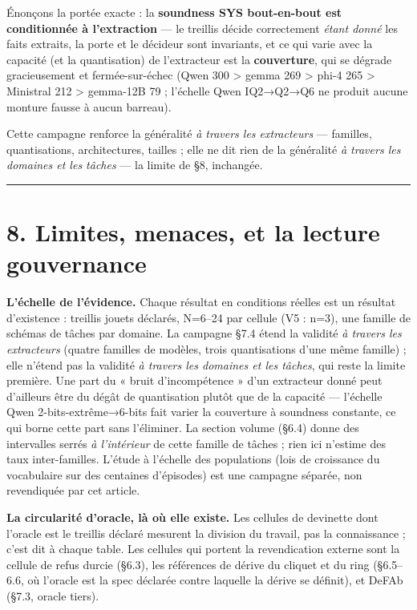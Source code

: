 \documentclass[11pt]{article}
\begin{document}
Énonçons la portée exacte : la \textbf{soundness SYS bout-en-bout est conditionnée à l'extraction} — le treillis décide correctement \emph{étant donné} les faits extraits, la porte et le décideur sont invariants, et ce qui varie avec la capacité (et la quantisation) de l'extracteur est la \textbf{couverture}, qui se dégrade gracieusement et fermée-sur-échec (Qwen 300 > gemma 269 > phi-4 265 > Ministral 212 > gemma-12B 79 ; l'échelle Qwen IQ2→Q2→Q6 ne produit aucune monture fausse à aucun barreau).

Cette campagne renforce la généralité \emph{à travers les extracteurs} — familles, quantisations, architectures, tailles ; elle ne dit rien de la généralité \emph{à travers les domaines et les tâches} — la limite de §8, inchangée.

\medskip\hrule\medskip

\section*{8. Limites, menaces, et la lecture gouvernance}

\textbf{L'échelle de l'évidence.} Chaque résultat en conditions réelles est un résultat d'existence : treillis jouets déclarés, N=6–24 par cellule (V5 : n=3), une famille de schémas de tâches par domaine. La campagne §7.4 étend la validité \emph{à travers les extracteurs} (quatre familles de modèles, trois quantisations d'une même famille) ; elle n'étend pas la validité \emph{à travers les domaines et les tâches}, qui reste la limite première. Une part du « bruit d'incompétence » d'un extracteur donné peut d'ailleurs être du dégât de quantisation plutôt que de la capacité — l'échelle Qwen 2-bits-extrême→6-bits fait varier la couverture à soundness constante, ce qui borne cette part sans l'éliminer. La section volume (§6.4) donne des intervalles serrés \emph{à l'intérieur} de cette famille de tâches ; rien ici n'estime des taux inter-familles. L'étude à l'échelle des populations (lois de croissance du vocabulaire sur des centaines d'épisodes) est une campagne séparée, non revendiquée par cet article.

\textbf{La circularité d'oracle, là où elle existe.} Les cellules de devinette dont l'oracle est le treillis déclaré mesurent la division du travail, pas la connaissance ; c'est dit à chaque table. Les cellules qui portent la revendication externe sont la cellule de refus durcie (§6.3), les références de dérive du cliquet et du ring (§6.5–6.6, où l'oracle est la spec déclarée contre laquelle la dérive se définit), et DeFAb (§7.3, oracle tiers).
\end{document}
